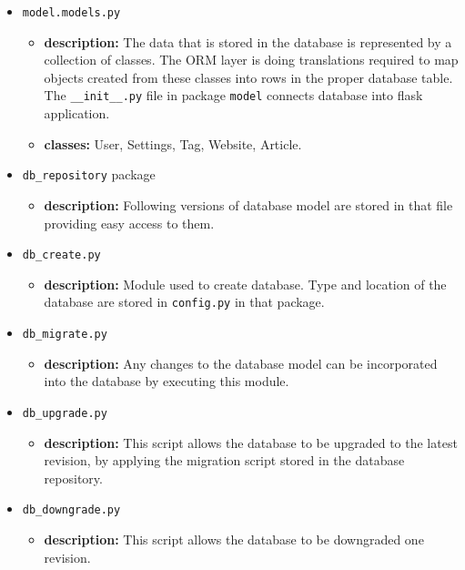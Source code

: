 \documentclass[12pt]{article}
\begin{document}
\begin{itemize}
	\item \texttt{model.models.py}
	\begin{itemize}
		\item \textbf{description:} The data that is stored in the database is represented by a collection of classes. The ORM layer is doing translations required to map objects created from these classes into rows in the proper database table. The \texttt{\_\_init\_\_.py} file in package \texttt{model} connects database into flask application.
		
		\item \textbf{classes:} User, Settings, Tag, Website, Article.
	\end{itemize}
	
	\item \texttt{db\_repository} package 
	\begin{itemize}
		\item \textbf{description:} Following versions of database model are stored in that file providing easy access to them.
	\end{itemize}
	
	\item \texttt{db\_create.py}
	\begin{itemize}
		\item \textbf{description:} Module used to create database. Type and location of the database are stored in \texttt{config.py} in that package.
	\end{itemize}
	
	\item \texttt{db\_migrate.py}
	\begin{itemize}
		\item \textbf{description:} Any changes to the database model can be incorporated into the database by executing this module. 
	\end{itemize}
	
	\item \texttt{db\_upgrade.py}
	\begin{itemize}
		\item \textbf{description:} This script allows the database to be upgraded to the latest revision, by applying the migration script stored in the database repository.
	\end{itemize}
	
	\item \texttt{db\_downgrade.py}
	\begin{itemize}
		\item \textbf{description:} This script allows the database to be downgraded one revision.
	\end{itemize}
	

\end{itemize}
\end{document}
